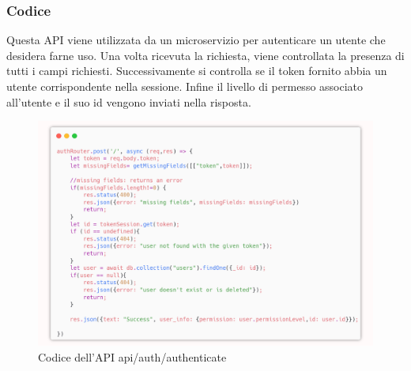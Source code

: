 \documentclass{report}
\begin{document}
\subsubsection*{Codice}
Questa API viene utilizzata da un microservizio per autenticare un utente che desidera farne uso.
Una volta ricevuta la richiesta, viene controllata la presenza di tutti i campi richiesti.
Successivamente si controlla se il token fornito abbia un utente corrispondente nella sessione.
Infine il livello di permesso associato all'utente e il suo id vengono inviati nella risposta.
\begin{figure}[H]
	\centering\includegraphics[width=1\textwidth]{images/microservizio-autenticazione/authenticate-carbon.png}
	Codice dell'API api/auth/authenticate
\end{figure}
\end{document}
